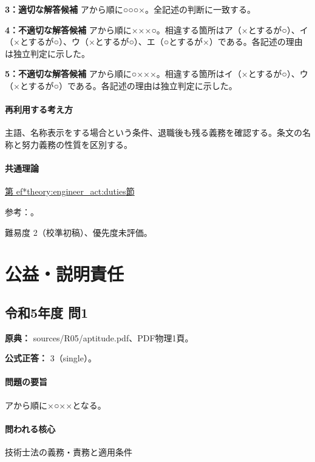 \noindent\textbf{3：適切な解答候補} アから順に○○○×。全記述の判断に一致する。\par

\noindent\textbf{4：不適切な解答候補} アから順に×××○。相違する箇所はア（×とするが○）、イ（×とするが○）、ウ（×とするが○）、エ（○とするが×）である。各記述の理由は独立判定に示した。\par

\noindent\textbf{5：不適切な解答候補} アから順に○×××。相違する箇所はイ（×とするが○）、ウ（×とするが○）である。各記述の理由は独立判定に示した。\par

\paragraph{再利用する考え方} 主語、名称表示をする場合という条件、退職後も残る義務を確認する。条文の名称と努力義務の性質を区別する。

\paragraph{共通理論} \hyperref[theory:engineer_act:duties]{第
ef*{theory:engineer_act:duties}節}

\par 参考：\cite{engineer_act_current}。

\par 難易度 2（校準初稿）、優先度未評価。

\section{公益・説明責任}

\subsection{令和5年度 問1}
\label{q:r05-reg-apt-01}

\noindent\textbf{原典：} sources/R05/aptitude.pdf、PDF物理1頁。

\textbf{公式正答：} 3（single）。

\paragraph{問題の要旨} アから順に×○××となる。

\paragraph{問われる核心} 技術士法の義務・責務と適用条件

